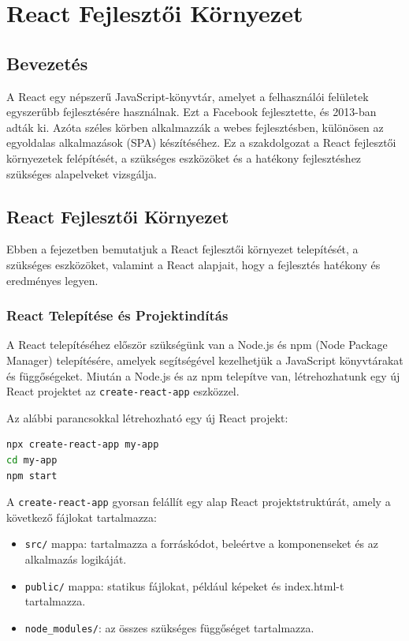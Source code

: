 \documentclass[colorlinks]{thesis-kando}
\theoremstyle{definition}
\theoremstyle{remark}
\begin{document}
\chapter{React Fejlesztői Környezet}

\section{Bevezetés}
A React egy népszerű JavaScript-könyvtár, amelyet a felhasználói felületek egyszerűbb fejlesztésére használnak. Ezt a Facebook fejlesztette, és 2013-ban adták ki. Azóta széles körben alkalmazzák a webes fejlesztésben, különösen az egyoldalas alkalmazások (SPA) készítéséhez. Ez a szakdolgozat a React fejlesztői környezetek felépítését, a szükséges eszközöket és a hatékony fejlesztéshez szükséges alapelveket vizsgálja.

\section{React Fejlesztői Környezet}
Ebben a fejezetben bemutatjuk a React fejlesztői környezet telepítését, a szükséges eszközöket, valamint a React alapjait, hogy a fejlesztés hatékony és eredményes legyen.

\subsection{React Telepítése és Projektindítás}
A React telepítéséhez először szükségünk van a Node.js és npm (Node Package Manager) telepítésére, amelyek segítségével kezelhetjük a JavaScript könyvtárakat és függőségeket. Miután a Node.js és az npm telepítve van, létrehozhatunk egy új React projektet az \texttt{create-react-app} eszközzel.

Az alábbi parancsokkal létrehozható egy új React projekt:
\begin{lstlisting}[language=bash]
npx create-react-app my-app
cd my-app
npm start
\end{lstlisting}

\pagebreak

A \texttt{create-react-app} gyorsan felállít egy alap React projektstruktúrát, amely a következő fájlokat tartalmazza:
\begin{itemize}
    \item \texttt{src/} mappa: tartalmazza a forráskódot, beleértve a komponenseket és az alkalmazás logikáját.
    \item \texttt{public/} mappa: statikus fájlokat, például képeket és index.html-t tartalmazza.
    \item \texttt{node\_modules/}: az összes szükséges függőséget tartalmazza.
\end{itemize}
\end{document}

